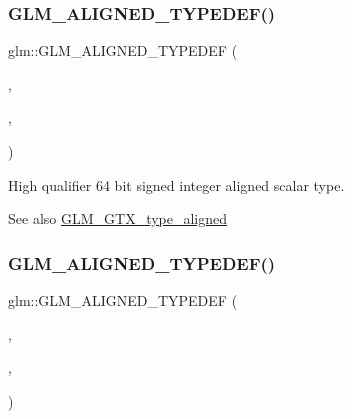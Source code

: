 \subsubsection{\texorpdfstring{G\+L\+M\+\_\+\+A\+L\+I\+G\+N\+E\+D\+\_\+\+T\+Y\+P\+E\+D\+E\+F()}{GLM\_ALIGNED\_TYPEDEF()}\hspace{0.1cm}{\footnotesize\ttfamily [28/209]}}
{\footnotesize\ttfamily glm\+::\+G\+L\+M\+\_\+\+A\+L\+I\+G\+N\+E\+D\+\_\+\+T\+Y\+P\+E\+D\+EF (\begin{DoxyParamCaption}\item[{\hyperlink{group__gtc__type__precision_ga7ffb27943e9569800979081bc548621c}{highp\+\_\+int64}}]{,  }\item[{aligned\+\_\+highp\+\_\+int64}]{,  }\item[{8}]{ }\end{DoxyParamCaption})}

High qualifier 64 bit signed integer aligned scalar type. \begin{DoxySeeAlso}{See also}
\hyperlink{group__gtx__type__aligned}{G\+L\+M\+\_\+\+G\+T\+X\+\_\+type\+\_\+aligned} 
\end{DoxySeeAlso}
\mbox{\label{group__gtx__type__aligned_gab3e10c77a20d1abad2de1c561c7a5c18}} 
\subsubsection{\texorpdfstring{G\+L\+M\+\_\+\+A\+L\+I\+G\+N\+E\+D\+\_\+\+T\+Y\+P\+E\+D\+E\+F()}{GLM\_ALIGNED\_TYPEDEF()}\hspace{0.1cm}{\footnotesize\ttfamily [29/209]}}
{\footnotesize\ttfamily glm\+::\+G\+L\+M\+\_\+\+A\+L\+I\+G\+N\+E\+D\+\_\+\+T\+Y\+P\+E\+D\+EF (\begin{DoxyParamCaption}\item[{\hyperlink{group__gtc__type__precision_ga417701b99e6e7992f35ab2ef694f88b2}{highp\+\_\+int8\+\_\+t}}]{,  }\item[{aligned\+\_\+highp\+\_\+int8\+\_\+t}]{,  }\item[{1}]{ }\end{DoxyParamCaption})}

